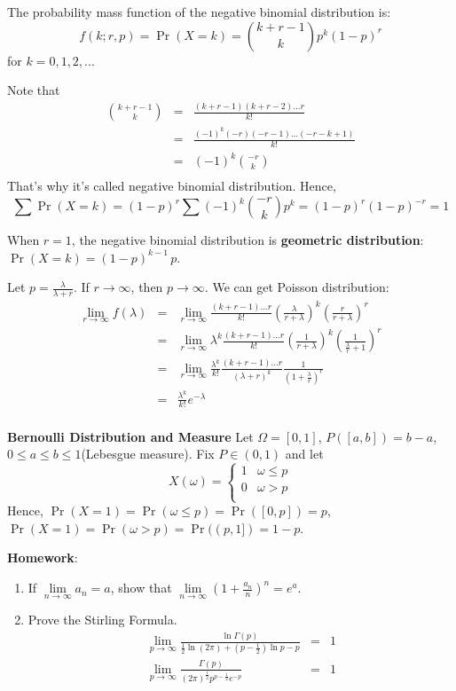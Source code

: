 \documentclass[11pt]{article}
\begin{document}
The probability mass function of the negative binomial distribution is:
\[f(k; r,p) = \Pr(X = k) = {k+r-1 \choose k} p^k (1-p)^r\]
for $k = 0, 1, 2, ...$

Note that \begin{eqnarray*}
{k+r-1 \choose k}&=&\frac{(k+r-1)(k+r-2)\dots r}{k!} \\
&=&\frac{(-1)^{k}(-r)(-r-1)\dots(-r-k+1)}{k!}\\
&=&(-1)^k{-r \choose k}\\
\end{eqnarray*}
That's why it's called negative binomial distribution. Hence, $$\sum{\Pr(X=k)}=(1-p)^r\sum{(-1)^k{-r \choose k}p^k}=(1-p)^r(1-p)^{-r}=1$$

When $r=1$, the negative binomial distribution is \textbf{geometric distribution}:$\Pr(X = k) = (1-p)^{k-1}\,p$.

Let $p=\frac{\lambda}{\lambda+r}$. If $r \rightarrow \infty$, then $p \rightarrow \infty$. We can get Poisson distribution:
\begin{eqnarray*}
\lim_{r\rightarrow\infty}f(\lambda) &=& \lim_{r\rightarrow\infty}\frac{(k+r-1)\dots r}{k!}\left(\frac{\lambda}{r+\lambda}\right)^k\left(\frac{r}{r+\lambda}\right)^r \\
&=&\lim_{r\rightarrow\infty}\lambda^k\frac{(k+r-1)\dots r}{k!}\left(\frac{1}{r+\lambda}\right)^k\left(\frac{1}{\frac{\lambda}{r}+1}\right)^r \\
&=&\lim_{r\rightarrow\infty}\frac{\lambda^k}{k!}\frac{(k+r-1)\dots r}{(\lambda+r)^k}\frac{1}{\left(1+\frac{\lambda}{r}\right)^r} \\
&=&\frac{\lambda^k}{k!}e^{-\lambda} \\
\end{eqnarray*} 

\textbf{Bernoulli Distribution and Measure}
Let $\Omega=[0, 1]$, $P([a,b])=b-a$, $0\le a\le b\le 1$(Lebesgue measure).
Fix $P \in (0,1)$ and let \[X(\omega) = \left\{\begin{array}{cc}
1 & \omega\le p \\
0 & \omega > p \\
\end{array}
\right.
\]
Hence, $\Pr(X=1)=\Pr(\omega\le p)=\Pr([0,p])=p$, $\Pr(X=1)=\Pr(\omega> p)=\Pr((p,1])=1-p$.

\textbf{Homework}:
\begin{enumerate}[(1)]
\item
If $\lim \limits_{n\rightarrow\infty}a_n=a$, show that $\lim \limits_{n\rightarrow\infty}\left(1+\frac{a_n}{n}\right)^n=e^{a}$.
\item
Prove the Stirling Formula.
\begin{eqnarray*}
\lim_{p\rightarrow\infty}\frac{\ln\Gamma(p)}{\frac{1}{2}\ln(2\pi)+(p-\frac{1}{2})\ln{p}-p}&=&1\\
\lim_{p\rightarrow\infty}\frac{\Gamma(p)}{(2\pi)^{\frac{1}{2}}p^{p-\frac{1}{2}}e^{-p}}&=&1
\end{eqnarray*}
\end{enumerate}
\end{document}
